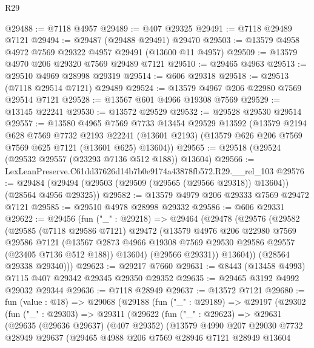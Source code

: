 \begin{lexlean}{R29}
\begin{coremodule}
@29488 := @7118 @4957
@29489 := @407 @29325
@29491 := @7118 @29489 @7121
@29494 := @29487 (@29488 @29491) @29470
@29503 := @13579 @4958 @4972 @7569 @29322 @4957 @29491 (@13600 @11 @4957)
@29509 := @13579 @4970 @206 @29320 @7569 @29489 @7121
@29510 := @29465 @4963
@29513 := @29510 @4969 @28998 @29319
@29514 := @606 @29318
@29518 := @29513 (@7118 @29514 @7121) @29489
@29524 := @13579 @4967 @206 @22980 @7569 @29514 @7121
@29528 := @13567 @601 @4966 @19308 @7569
@29529 := @13145 @22241
@29530 := @13572 @29529
@29532 := @29528 @29530 @29514
@29557 := @13580
    @4965
    @7569
    @7733
    @13454
    @29529
    @13592
    (@13579
      @2194
      @628
      @7569
      @7732
      @2193
      @22241
      (@13601 @2193)
      (@13579 @626 @206 @7569 @7569 @625 @7121 (@13601 @625) @13604))
@29565 := @29518 (@29524 (@29532 @29557 (@23293 @7136 @512 @188)) @13604)
@29566 := LexLeanPreserve.C61dd37626d14b7b0e9174a43878fb572.R29.__rel_103
@29576 := @29484 (@29494 (@29503 (@29509 (@29565 (@29566 @29318)) @13604)) (@28564 @4956 @29325))
@29582 := @13579 @4979 @206 @29333 @7569 @29472 @7121
@29585 := @29510 @4978 @28998 @29332
@29586 := @606 @29331
@29622 := @29456
    (fun ("_" : @29218) =>
    @29464
      (@29478
        (@29576
          (@29582
            (@29585
              (@7118 @29586 @7121)
              @29472
              (@13579
                @4976
                @206
                @22980
                @7569
                @29586
                @7121
                (@13567 @2873 @4966 @19308 @7569 @29530 @29586 @29557 (@23405 @7136 @512 @188))
                @13604)
              (@29566 @29331))
            @13604))
        (@28564 @29338 @29340)))
@29623 := @29217 @7660
@29631 := @8443 (@13458 @4993) @7115 @407 @29342 @29345 @29350 @29352
@29635 := @29465 @3192 @4992 @29032 @29344
@29636 := @7118 @28949
@29637 := @13572 @7121
@29680 := fun (value : @18) =>
  @29068
    (@29188
      (fun ("_" : @29189) =>
      @29197
        (@29302
          (fun ("_" : @29303) =>
          @29311
            (@29622
              (fun ("_" : @29623) =>
              @29631
                (@29635
                  (@29636 @29637)
                  (@407 @29352)
                  (@13579
                    @4990
                    @207
                    @29030
                    @7732
                    @28949
                    @29637
                    (@29465
                      @4988
                      @206
                      @7569
                      @28946
                      @7121
                      @28949
                      @13604

\end{coremodule}
\end{lexlean}
